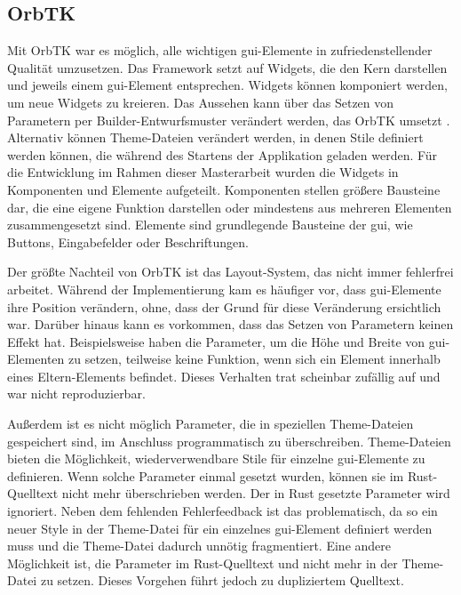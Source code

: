 \subsection{OrbTK}
Mit OrbTK war es möglich, alle wichtigen \gls{gui}-Elemente in zufriedenstellender Qualität umzusetzen. Das Framework setzt auf Widgets, die den Kern darstellen und jeweils einem \gls{gui}-Element entsprechen. Widgets können komponiert werden, um neue Widgets zu kreieren. Das Aussehen kann über das Setzen von Parametern per Builder-Entwurfsmuster verändert werden, das OrbTK umsetzt \cite{RedoxosOrbtk2015}. Alternativ können Theme-Dateien verändert werden, in denen Stile definiert werden können, die während des Startens der Applikation geladen werden. Für die Entwicklung im Rahmen dieser Masterarbeit wurden die Widgets in Komponenten und Elemente aufgeteilt. Komponenten stellen größere Bausteine dar, die eine eigene Funktion darstellen oder mindestens aus mehreren Elementen zusammengesetzt sind. Elemente sind grundlegende Bausteine der \gls{gui}, wie Buttons, Eingabefelder oder Beschriftungen.

Der größte Nachteil von OrbTK ist das Layout-System, das nicht immer fehlerfrei arbeitet. Während der Implementierung kam es häufiger vor, dass \gls{gui}-Elemente ihre Position verändern, ohne, dass der Grund für diese Veränderung ersichtlich war. Darüber hinaus kann es vorkommen, dass das Setzen von Parametern keinen Effekt hat. Beispielsweise haben die Parameter, um die Höhe und Breite von \gls{gui}-Elementen zu setzen, teilweise keine Funktion, wenn sich ein Element innerhalb eines Eltern-Elements befindet. Dieses Verhalten trat scheinbar zufällig auf und war nicht reproduzierbar.


Außerdem ist es nicht möglich Parameter, die in speziellen Theme-Dateien gespeichert sind, im Anschluss programmatisch zu überschreiben. Theme-Dateien bieten die Möglichkeit, wiederverwendbare Stile für einzelne \gls{gui}-Elemente zu definieren. Wenn solche Parameter einmal gesetzt wurden, können sie im Rust-Quelltext nicht mehr überschrieben werden. Der in Rust gesetzte Parameter wird ignoriert. Neben dem fehlenden Fehlerfeedback ist das problematisch, da so ein neuer Style in der Theme-Datei für ein einzelnes \gls{gui}-Element definiert werden muss und die Theme-Datei dadurch unnötig fragmentiert. Eine andere Möglichkeit ist, die Parameter im Rust-Quelltext und nicht mehr in der Theme-Datei zu setzen. Dieses Vorgehen führt jedoch zu dupliziertem Quelltext.

